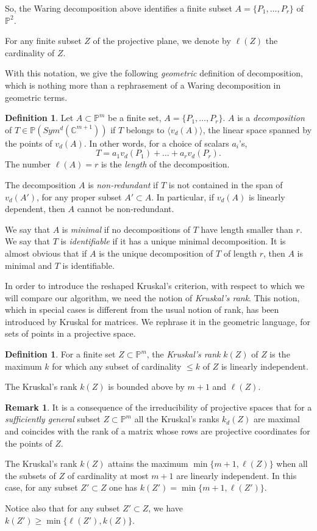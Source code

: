 \documentclass[a4paper,10pt,oneside]{article}
\theoremstyle{casep}
\newcommand{\C}{\mathbb{C}}
\newcommand{\Pj}{\mathbb{P}}
\theoremstyle{definition}
\newtheorem{definition}[theorem]{Definition}
\newtheorem{remark}[theorem]{Remark}
\begin{document}
So, the Waring decomposition above identifies a finite subset $A=\{P_1,\dots,P_r\}$ of $\Pj^2$.
\smallskip

For any finite subset $Z$ of the projective plane, we denote by $\ell(Z)$ the cardinality of $Z$.

With this notation, we give the following \emph{geometric} definition of decomposition, which is nothing more than a rephrasement of a Waring decomposition
in geometric terms.

\begin{definition}
Let $A \subset \Pj^m $ be a finite set, $A=\{P_1,\dots, P_r\}$. $A$ is a \emph{decomposition} of $T\in \Pj(Sym^d(\C^{m+1}))$ if $ T $ belongs to $ \langle v_d(A) \rangle$, 
the linear space spanned by the points of $v_d(A)$. In other words, for a choice of scalars $a_i$'s,
$$T = a_1v_d(P_1)+\dots + a_rv_d(P_r). $$
The number $\ell(A)=r$ is the \emph{length} of the decomposition.

The decomposition $A$ is \emph{non-redundant} if $T$ is not contained in the span of $v_d(A')$, for any proper subset
$A'\subset A$. In particular, if $v_d(A)$ is linearly dependent, then $A$ cannot be non-redundant.

We say that $A$ is \emph{minimal} if no decompositions of $T$ have length smaller than $r$.
We say that $T$ is \emph{identifiable} if it has a unique minimal decomposition. It is almost obvious that if $A$ 
is the unique decomposition of $T$ of length $r$, then $A$ is minimal and $T$ is identifiable.
\end{definition}

In order to introduce the reshaped Kruskal's criterion, with respect to which we will compare our algorithm, 
we need the notion of \emph{Kruskal's rank}. This notion, which in special cases is different from the usual notion of rank, 
has been introduced by Kruskal for matrices. We rephrase it in the geometric language, for sets of points in a projective space.

\begin{definition}\label{kr}
For a finite set $Z \subset \Pj^m$, the \emph{Kruskal's rank} $k(Z)$ of $Z$ is the maximum $k$ for which any subset
of cardinality $\leq k$ of $Z$ is linearly independent.

The Kruskal's rank $k(Z)$ is bounded above by $m+1$ and $\ell(Z)$. 
\end{definition}


\begin{remark}\label{ksub} It is a consequence of the irreducibility of projective spaces that for a \emph{sufficiently general} subset 
$Z\subset\Pj^m$ all the Kruskal's ranks $k_d(Z)$ are maximal and coincides with the rank of a matrix whose rows are
projective coordinates for the points of $Z$.

The Kruskal's rank $k(Z)$ attains the maximum $\min\{m+1, \ell(Z)\}$ when all the subsets of $Z$ of cardinality at most $m+1$ are linearly independent. In this case, for any subset $Z'\subset Z$ one has
$k(Z')=\min\{m+1, \ell(Z')\}$.

Notice also that for any subset $Z'\subset Z$, we have $k(Z')\geq \min\{\ell(Z'), k(Z)\}$.
\end{remark}
\end{document}
